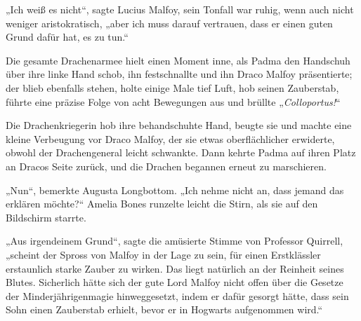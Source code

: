 „Ich weiß es nicht“, sagte Lucius Malfoy, sein Tonfall war ruhig, wenn auch nicht weniger aristokratisch, „aber ich muss darauf vertrauen, dass er einen guten Grund dafür hat, es zu tun.“

Die gesamte Drachenarmee hielt einen Moment inne, als Padma den Handschuh über ihre linke Hand schob, ihn festschnallte und ihn Draco Malfoy präsentierte; der blieb ebenfalls stehen, holte einige Male tief Luft, hob seinen Zauberstab, führte eine präzise Folge von acht Bewegungen aus und brüllte „\emph{Colloportus!}“

Die Drachenkriegerin hob ihre behandschuhte Hand, beugte sie und machte eine kleine Verbeugung vor Draco Malfoy, der sie etwas oberflächlicher erwiderte, obwohl der Drachengeneral leicht schwankte. Dann kehrte Padma auf ihren Platz an Dracos Seite zurück, und die Drachen begannen erneut zu marschieren.

„Nun“, bemerkte Augusta Longbottom. „Ich nehme nicht an, dass jemand das erklären möchte?“ Amelia Bones runzelte leicht die Stirn, als sie auf den Bildschirm starrte.

„Aus irgendeinem Grund“, sagte die amüsierte Stimme von Professor Quirrell, „scheint der Spross von Malfoy in der Lage zu sein, für einen Erstklässler erstaunlich starke Zauber zu wirken. Das liegt natürlich an der Reinheit seines Blutes. Sicherlich hätte sich der gute Lord Malfoy nicht offen über die Gesetze der Minderjährigenmagie hinweggesetzt, indem er dafür gesorgt hätte, dass sein Sohn einen Zauberstab erhielt, bevor er in Hogwarts aufgenommen wird.“

